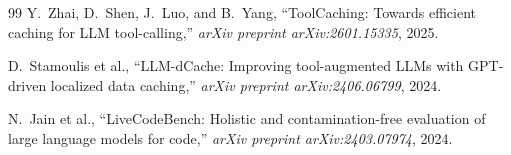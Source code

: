 \documentclass[conference]{IEEEtran}
\begin{document}
\begin{thebibliography}{99}
Y.~Zhai, D.~Shen, J.~Luo, and B.~Yang, ``ToolCaching: Towards efficient
caching for LLM tool-calling,'' \textit{arXiv preprint arXiv:2601.15335},
2025.

D.~Stamoulis et al., ``LLM-dCache: Improving tool-augmented LLMs with
GPT-driven localized data caching,'' \textit{arXiv preprint
arXiv:2406.06799}, 2024.

N.~Jain et al., ``LiveCodeBench: Holistic and contamination-free
evaluation of large language models for code,'' \textit{arXiv preprint
arXiv:2403.07974}, 2024.

\end{thebibliography}
\end{document}
